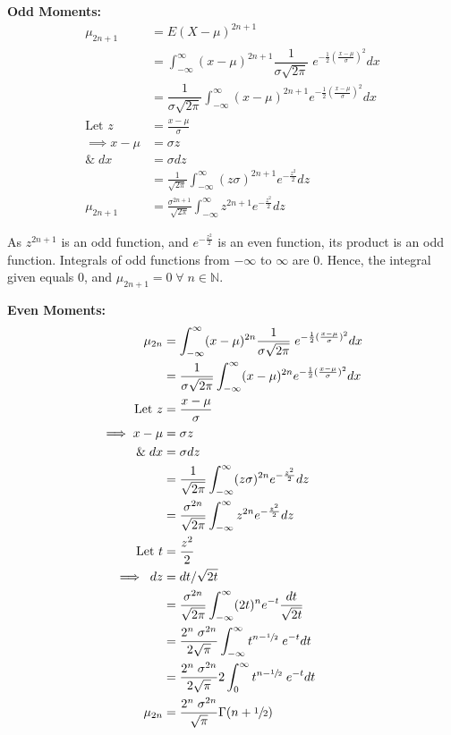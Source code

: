\documentclass[
10pt, %
a4paper, %
]{report}
\begin{document}
\textbf{Odd Moments:}
\begin{align*}
    \mu_{2n+1} &= E(X-\mu)^{2n+1} \\
               &= \int_{-\infty}^{\infty} (x-\mu)^{2n+1} \dfrac{1}{\sigma\sqrt{2\pi}} \; e^{-\frac{1}{2}( \frac{x-\mu}{\sigma})^2} dx \\
               &= \dfrac{1}{\sigma\sqrt{2\pi}} \int_{-\infty}^{\infty} (x-\mu)^{2n+1} e^{-\frac{1}{2}(\frac{x-\mu}{\sigma})^2} dx \\
               \text{Let } z &= \frac{x-\mu}{\sigma} \\ \implies x-\mu &= \sigma z \\ \& \; dx &= \sigma dz \\
               &= \frac{1}{\sqrt{2\pi}} \int_{-\infty}^{\infty} (z\sigma)^{2n+1} e^{- \frac{z^2}{2}} dz\\
    \mu_{2n+1} &= \frac{\sigma^{2n+1}}{\sqrt{2\pi}} \int_{-\infty}^{\infty} z^{2n+1} e^{- \frac{z^2}{2}} dz
\end{align*}

As \(z^{2n+1}\) is an odd function, and \(e^{- \frac{z^2}{2}}\) is an even function, its product is an odd function. Integrals of odd functions from \(-\infty\) to \(\infty\) are 0. Hence, the integral given equals 0, and \(\mu_{2n+1} = 0 \; \forall \; n \in \mathbb{N}\).

\textbf{Even Moments:}
\begin{align*}
    \mu_{2n} &= \int_{-\infty}^{\infty} (x-\mu)^{2n} \dfrac{1}{\sigma\sqrt{2\pi}} \;             e^{-\frac{1}{2}( \frac{x-\mu}{\sigma})^2} dx \\
             &= \dfrac{1}{\sigma\sqrt{2\pi}} \int_{-\infty}^{\infty} (x-\mu)^{2n} e^{-\frac{1}{2}(\frac{x-\mu}{\sigma})^2} dx \\
             \text{Let } z &= \frac{x-\mu}{\sigma} \\ \implies x-\mu &= \sigma z \\ \& \; dx &= \sigma dz \\
             &= \frac{1}{\sqrt{2\pi}} \int_{-\infty}^{\infty} (z\sigma)^{2n} e^{- \frac{z^2}{2}} dz\\
             &= \frac{\sigma^{2n}}{\sqrt{2\pi}} \int_{-\infty}^{\infty} z^{2n} e^{- \frac{z^2}{2}} dz\\
             \text{Let } t &= \frac{z^2}{2} \\ \implies \; dz &= dt/\sqrt{2t} \\
             &= \frac{\sigma^{2n}}{\sqrt{2\pi}} \int_{-\infty}^{\infty} (2t)^n e^{-t} \frac{dt}{\sqrt{2t}}\\
             &= \frac{2^n \; \sigma^{2n}}{2\sqrt{\pi}} \int_{-\infty}^{\infty} t^{n-\sfrac{1}{2}} \; e^{-t} dt \\
             &= \frac{2^n \; \sigma^{2n}}{2\sqrt{\pi}} 2 \int_0^{\infty} t^{n-\sfrac{1}{2}} \; e^{-t} dt \\
    \mu_{2n} &= \frac{2^n \; \sigma^{2n}}{\sqrt{\pi}} \Gamma (n + \sfrac{1}{2})
\end{align*}
\end{document}
